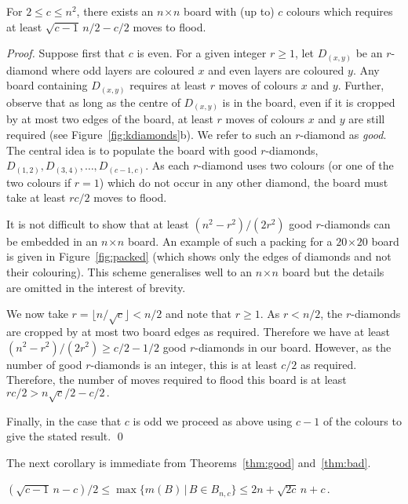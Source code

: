 \documentclass[a4paper,11pt]{llncs}
\newcounter{l}
\renewcommand{\geq}{\geqslant}
\renewcommand{\leq}{\leqslant}
\newcommand{\Mnc}{\ensuremath{\max\{m(B)\,|\,B \in B_{n,c}\}}}
\newcommand{\recdim}[2]{$#1$$\mspace{1mu}$$\times$$\mspace{1mu}$$#2$}
\begin{document}
\begin{theorem} \label{thm:bad}
    For $2\leq c\leq n^2$, there exists an \recdim{n}{n} board with (up to) $c$ colours which requires at least $\sqrt{c-1}\, n/2-c/2$ moves to flood.
\end{theorem}
\begin{proof}


    Suppose first that $c$ is even. For a given integer $r\geq 1$, let $D_{(x,y)}$ be an $r$-diamond where odd layers are coloured $x$ and even layers are coloured $y$. Any board containing $D_{(x,y)}$ requires at least $r$ moves of colours $x$ and $y$. Further, observe that as long as the centre of $D_{(x,y)}$ is in the board, even if it is cropped by at most two edges of the board, at least $r$ moves of colours $x$ and $y$ are still required (see Figure~\ref{fig:kdiamonds}b). We refer to such an $r$-diamond as \emph{good}. The central idea is to populate the board with good $r$-diamonds, $D_{(1,2)},D_{(3,4)}, \ldots, D_{(c-1,c)}$. As each $r$-diamond uses two colours (or one of the two colours if $r=1$) which do not occur in any other diamond, the board must take at least $rc/2$ moves to flood.

    It is not difficult to show that at least $(n^2-r^2)/(2r^2)$ good $r$-diamonds can be embedded in an \recdim{n}{n} board. An example of such a packing for a \recdim{20}{20} board is given in Figure~\ref{fig:packed} (which shows only the edges of diamonds and not their colouring). This scheme generalises well to an \recdim{n}{n} board but the details are omitted in the interest of brevity.
    



    We now take $r=\lfloor n/\sqrt{c}\rfloor < n/2$ and note that $r\geq 1$. As $r<n/2$, the $r$-diamonds are cropped by at most two board edges as required. Therefore we have at least $(n^2-r^2)/(2r^2) \geq c/2 - 1/2$ good $r$-diamonds in our board. However, as the number of good $r$-diamonds is an integer, this is at least $c/2$ as required. Therefore, the number of moves required to flood this board is at least $rc/2 > n\sqrt{c}/2 - c/2\,.$

    Finally, in the case that $c$ is odd we proceed as above using $c-1$ of the colours to give the stated result. \qed
\end{proof}

The next corollary is immediate from Theorems~\ref{thm:good} and~\ref{thm:bad}.

\begin{corollary}
    \label{col:moves}
    $({\sqrt{c-1}\, n-c})/{2} \leq \Mnc \leq 2n+\sqrt{2c}\,n+c$\,.
\end{corollary}
\end{document}
